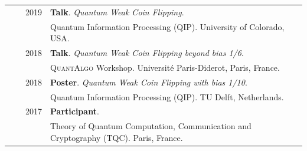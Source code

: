 \documentclass[a4paper,10pt]{article}
\begin{document}
\begin{longtable}{rrp{11cm}}
  & ~~2019 &\textbf{Talk}. \emph{Quantum Weak Coin Flipping}. \\
  & ~~~~~~ &Quantum Information Processing (\textsc{QIP}). University of Colorado, USA. \\
  & ~~2018 &\textbf{Talk}. \emph{Quantum Weak Coin Flipping beyond bias 1/6}. \\  
  & ~~~~~~ &\textsc{QuantAlgo} Workshop. Université Paris-Diderot, Paris, France. \\
  & ~~2018 &\textbf{Poster}. \emph{Quantum Weak Coin Flipping with bias 1/10}. \\
  & ~~~~~~ &Quantum Information Processing (\textsc{QIP}). TU Delft, Netherlands. \\
  & ~~2017 &\textbf{Participant}. \\
  & ~~~~~~ &Theory of Quantum Computation, Communication and Cryptography (\textsc{TQC}). Paris, France.
  \end{longtable}

\end{document}
